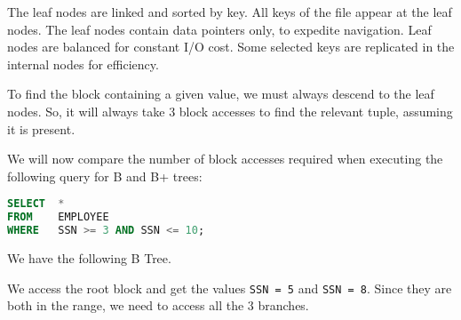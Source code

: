 \documentclass[a4paper, openany]{memoir}
\newcommand{\bnode}[3]{
    \draw (0+#1, 0+#2) -- (4.25+#1, 0+#2)
        -- (4.25+#1, 0.5+#2) 
        -- (0+#1, 0.5+#2)
        -- cycle;
    \foreach \i in {0.75, 1.75, 2.5, 3.5} {
        \draw (\i+#1, 0+#2) -- (\i+#1, 0.5+#2);
    }
    \foreach \i in {0, 1.75, 3.5} {
        \draw[fill=black] (\i+0.75/2+#1, 0.25+#2) circle (2pt);
    }
    \foreach \i in {0.75, 2.5} {
        \filldraw[red] (\i+0.75+#1, 0.25+#2) circle (2pt);
    }
    \foreach \x[count=\i] in {#3} {
        \node at (1.75*\i+#1-0.675, 0.25+#2) {\texttt{\x}};
    }
}
\begin{document}

The leaf nodes are linked and sorted by key. All keys of the file appear at the leaf nodes. The leaf nodes contain data pointers only, to expedite navigation. Leaf nodes are balanced for constant I/O cost. Some selected keys are replicated in the internal nodes for efficiency.

To find the block containing a given value, we must always descend to the leaf nodes. So, it will always take 3 block accesses to find the relevant tuple, assuming it is present.

We will now compare the number of block accesses required when executing the following query for B and B+ trees:
\begin{lstlisting}[language=SQL]
SELECT  * 
FROM    EMPLOYEE
WHERE   SSN >= 3 AND SSN <= 10;
\end{lstlisting}
We have the following B Tree.
\begin{figure}[H]
    \centering
\end{figure}
\noindent We access the root block and get the values \texttt{SSN = 5} and \texttt{SSN = 8}. Since they are both in the range, we need to access all the 3 branches. 
\end{document}
